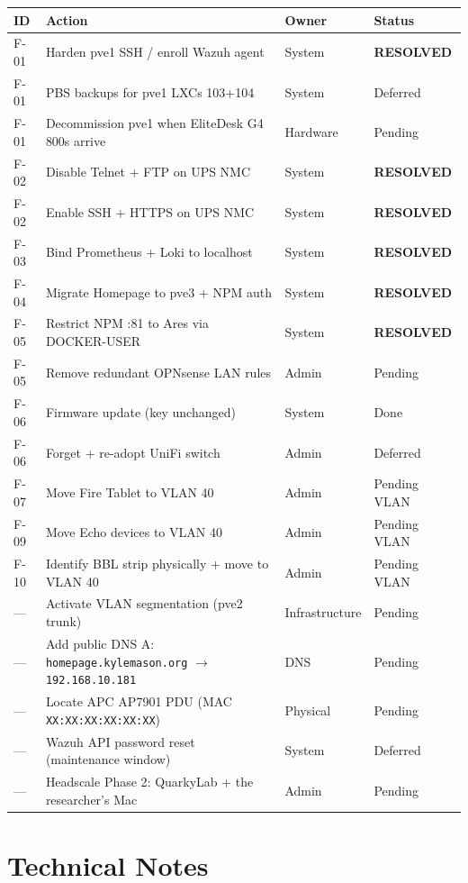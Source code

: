 \documentclass[11pt,a4paper]{article}
\newcommand{\resolved}{\colorbox{resolved}{\color{white}\small\textbf{RESOLVED}}}
\begin{document}
\begin{longtable}{@{}p{0.8cm}p{7.5cm}p{2cm}p{2cm}@{}}
\toprule
\textbf{ID} & \textbf{Action} & \textbf{Owner} & \textbf{Status} \\
\midrule
\endhead
F-01 & Harden pve1 SSH / enroll Wazuh agent & System & \resolved \\
F-01 & PBS backups for pve1 LXCs 103+104 & System & Deferred \\
F-01 & Decommission pve1 when EliteDesk G4 800s arrive & Hardware & Pending \\
F-02 & Disable Telnet + FTP on UPS NMC & System & \resolved \\
F-02 & Enable SSH + HTTPS on UPS NMC & System & \resolved \\
F-03 & Bind Prometheus + Loki to localhost & System & \resolved \\
F-04 & Migrate Homepage to pve3 + NPM auth & System & \resolved \\
F-05 & Restrict NPM :81 to Ares via DOCKER-USER & System & \resolved \\
F-05 & Remove redundant OPNsense LAN rules & Admin & Pending \\
F-06 & Firmware update (key unchanged) & System & Done \\
F-06 & Forget + re-adopt UniFi switch & Admin & Deferred \\
F-07 & Move Fire Tablet to VLAN 40 & Admin & Pending VLAN \\
F-09 & Move Echo devices to VLAN 40 & Admin & Pending VLAN \\
F-10 & Identify BBL strip physically + move to VLAN 40 & Admin & Pending VLAN \\
— & Activate VLAN segmentation (pve2 trunk) & Infrastructure & Pending \\
— & Add public DNS A: \texttt{homepage.kylemason.org} $\to$ \texttt{192.168.10.181} & DNS & Pending \\
— & Locate APC AP7901 PDU (MAC \texttt{XX:XX:XX:XX:XX:XX}) & Physical & Pending \\
— & Wazuh API password reset (maintenance window) & System & Deferred \\
— & Headscale Phase 2: QuarkyLab + the researcher's Mac & Admin & Pending \\
\bottomrule
\end{longtable}

\section{Technical Notes}
\end{document}
